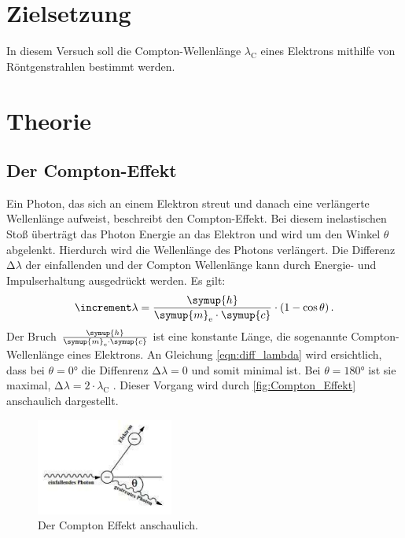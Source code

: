 \section{Zielsetzung}
In diesem Versuch soll die Compton-Wellenlänge $\lambda_\text{C}$ eines Elektrons mithilfe von Röntgenstrahlen bestimmt werden.

\section{Theorie}
\label{sec:Theorie}
\subsection{Der Compton-Effekt}
Ein Photon, das sich an einem Elektron streut und danach eine verlängerte Wellenlänge aufweist, beschreibt den Compton-Effekt.
Bei diesem inelastischen Stoß überträgt das Photon Energie an das Elektron und wird um den Winkel $\theta$ abgelenkt.
Hierdurch wird die Wellenlänge des Photons verlängert.
Die Differenz $\increment \lambda$ der einfallenden und der Compton Wellenlänge kann durch Energie- und Impulserhaltung ausgedrückt werden.
Es gilt:
\begin{equation}\label{eqn:diff_lambda}
    \increment \lambda = \frac{\symup{h}}{\symup{m}_\text{e} \cdot \symup{c}} \cdot (1 - \cos\theta) \, .
\end{equation}
Der Bruch $\frac{\symup{h}}{\symup{m}_\text{e} \cdot \symup{c}}$ ist eine konstante Länge, die sogenannte Compton-Wellenlänge eines Elektrons.
An Gleichung \eqref{eqn:diff_lambda} wird ersichtlich, dass bei $\theta = 0°$ die Diffenrenz $\increment \lambda = 0$ und somit minimal ist.
Bei $\theta = 180°$ ist sie maximal, $\increment \lambda = 2 \cdot \lambda_\text{C}$ .
Dieser Vorgang wird durch \autoref{fig:Compton_Effekt} anschaulich dargestellt.

\begin{figure}
    \centering
    \includegraphics[width=0.4\textwidth]{bilder/compton_effekt.pdf}
    \caption{Der Compton Effekt anschaulich.}
    \label{fig:Compton_Effekt}
\end{figure}

